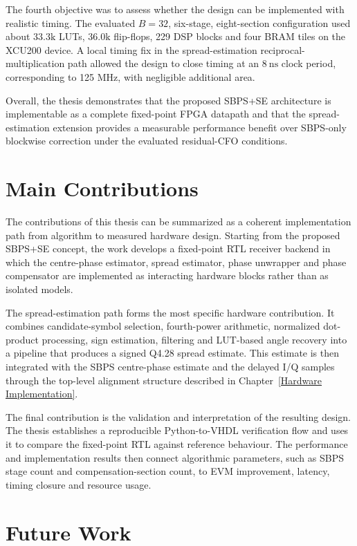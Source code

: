 The fourth objective was to assess whether the design can be implemented with realistic timing. The evaluated \(B=32\), six-stage, eight-section configuration used about \(33.3\mathrm{k}\) LUTs, \(36.0\mathrm{k}\) flip-flops, 229 DSP blocks and four BRAM tiles on the XCU200 device. A local timing fix in the spread-estimation reciprocal-multiplication path allowed the design to close timing at an \(8~\mathrm{ns}\) clock period, corresponding to 125 MHz, with negligible additional area.

Overall, the thesis demonstrates that the proposed \ac{SBPS}+\ac{SE} architecture is implementable as a complete fixed-point \ac{FPGA} datapath and that the spread-estimation extension provides a measurable performance benefit over \ac{SBPS}-only blockwise correction under the evaluated residual-\ac{CFO} conditions.

\section{Main Contributions}

The contributions of this thesis can be summarized as a coherent implementation path from algorithm to measured hardware design. Starting from the proposed \ac{SBPS}+\ac{SE} concept, the work develops a fixed-point \ac{RTL} receiver backend in which the centre-phase estimator, spread estimator, phase unwrapper and phase compensator are implemented as interacting hardware blocks rather than as isolated models.

The spread-estimation path forms the most specific hardware contribution. It combines candidate-symbol selection, fourth-power arithmetic, normalized dot-product processing, sign estimation, filtering and \ac{LUT}-based angle recovery into a pipeline that produces a signed Q4.28 spread estimate. This estimate is then integrated with the \ac{SBPS} centre-phase estimate and the delayed I/Q samples through the top-level alignment structure described in Chapter~\ref{Hardware Implementation}.

The final contribution is the validation and interpretation of the resulting design. The thesis establishes a reproducible Python-to-\ac{VHDL} verification flow and uses it to compare the fixed-point \ac{RTL} against reference behaviour. The performance and implementation results then connect algorithmic parameters, such as \ac{SBPS} stage count and compensation-section count, to \ac{EVM} improvement, latency, timing closure and resource usage.

\section{Future Work}

